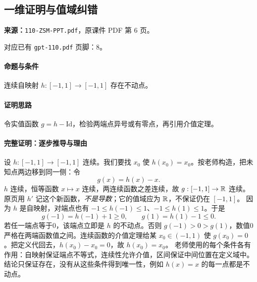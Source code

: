 \clearpage\subsection{一维证明与值域纠错}
\textbf{来源：}\texttt{110-ZSM-PPT.pdf}，原课件 PDF 第 6 页。\par
对应已有 \texttt{gpt-110.pdf} 页脚：8。\par
\paragraph{命题与条件}连续自映射 $h:[-1,1]\to[-1,1]$ 存在不动点。
\paragraph{证明思路}令实值函数 $g=h-\mathrm{Id}$，检验两端点异号或有零点，再引用介值定理。
\paragraph{完整证明：逐步推导与理由}

设 $h:[-1,1]\to[-1,1]$ 连续。我们要找 $x_0$ 使 $h(x_0)=x_0$。按老师构造，把未知点两边移到同一侧：令
\[g(x)=h(x)-x.\]
$h$ 连续，恒等函数 $x\mapsto x$ 连续，两连续函数之差连续，故 $g:[-1,1]\to\mathbb{R}$ 连续。原页用 $h'$ 记这个新函数，\emph{不是导数}；它的值域应为 $\mathbb{R}$，不保证仍在 $[-1,1]$。
因为 $h$ 是自映射，对端点也有 $-1\le h(-1)\le1$、$-1\le h(1)\le1$。于是
\[g(-1)=h(-1)+1\ge0,\qquad g(1)=h(1)-1\le0.\]
若任一端点等于0，该端点立即是 $h$ 的不动点。否则 $g(-1)>0>g(1)$，数值0严格在两端函数值之间。连续函数的介值定理给某 $x_0\in(-1,1)$ 使 $g(x_0)=0$。把定义代回去，$h(x_0)-x_0=0$，故 $h(x_0)=x_0$。
老师使用的每个条件各有作用：自映射保证端点不等式，连续性允许介值，区间保证中间位置在定义域中。结论只保证存在，没有从这些条件得到唯一性，例如 $h(x)=x$ 的每一点都是不动点。

